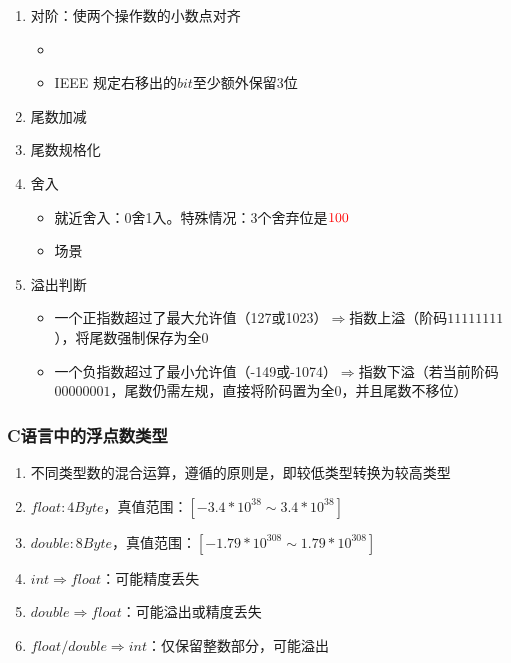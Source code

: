 \documentclass[a4paper,12pt]{article}
\begin{document}
    \begin{enumerate}
        \item 对阶：使两个操作数的小数点对齐
        \begin{itemize}
            \item {\color{customgreen}{小阶码向大阶码看齐}}
            \item IEEE 规定右移出的$bit$至少额外保留3位
        \end{itemize}
        \item 尾数加减
        \item 尾数规格化
        \item 舍入
        \begin{itemize}
            \item 就近舍入：0舍1入。特殊情况：3个舍弃位是${\color{red}{100}}$
            \item 场景
        \end{itemize}
        \item 溢出判断
        \begin{itemize}
            \item 一个正指数超过了最大允许值（127或1023）$\Rightarrow$指数上溢（阶码$1111 1111$），将尾数强制保存为全0
            \item 一个负指数超过了最小允许值（-149或-1074）$\Rightarrow$指数下溢（若当前阶码$0000 0001$，尾数仍需左规，直接将阶码置为全0，并且尾数不移位）
        \end{itemize}
    \end{enumerate}

    \subsubsection{C语言中的浮点数类型}

    \begin{enumerate}
        \item 不同类型数的混合运算，遵循的原则是{\color{customgreen}{类型提升}}，即较低类型转换为较高类型
        \item $float: 4Byte$，真值范围：$[-3.4*10^{38} \sim 3.4 * 10^{38}]$
        \item $double: 8Byte$，真值范围：$[-1.79*10^{308} \sim 1.79 * 10^{308}]$
        \item $int \Rightarrow float$：可能精度丢失
        \item $double \Rightarrow float$：可能溢出或精度丢失
        \item $float/double \Rightarrow int$：仅保留整数部分，可能溢出
    \end{enumerate}
\end{document}
